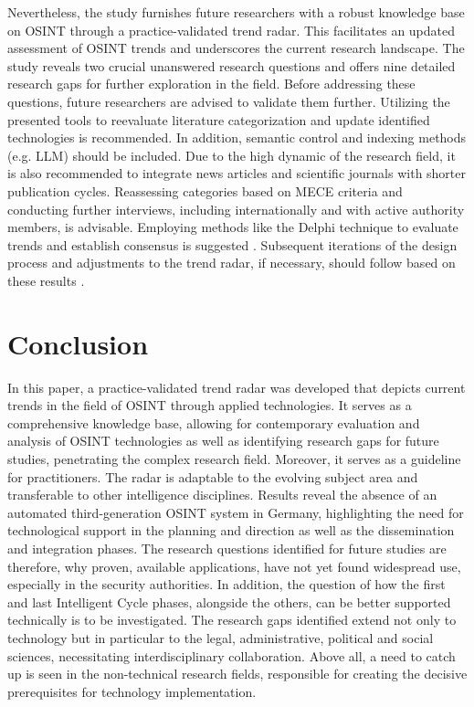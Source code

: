 \documentclass[10pt]{article}
\begin{document}
Nevertheless, the study furnishes future researchers with a robust knowledge base on OSINT
through a practice-validated trend radar. This facilitates an updated assessment of OSINT
trends and underscores the current research landscape. The study reveals two crucial
unanswered research questions and offers nine detailed research gaps for further exploration
in the field. Before addressing these questions, future researchers are advised
to validate them further. Utilizing the presented tools to reevaluate literature
categorization and update identified technologies is recommended. In addition, semantic
control and indexing methods (e.g. LLM) should be included. Due to the high dynamic of the research field,
it is also recommended to integrate news articles and scientific journals with shorter publication cycles.
Reassessing categories based on MECE criteria and conducting further interviews, including internationally
and with active authority members, is advisable. Employing methods like the Delphi technique to evaluate
trends and establish consensus is suggested \cite{Hader.2000}. Subsequent iterations of the design process and adjustments
to the trend radar, if necessary, should follow based on these results \cite{Peffers.2007,Sonnenberg.2012}.

\section{Conclusion}

In this paper, a practice-validated trend radar was developed that depicts current trends
in the field of OSINT through applied technologies. It serves as a comprehensive knowledge base,
allowing for contemporary evaluation and analysis of OSINT technologies as well as identifying research
gaps for future studies, penetrating the complex research field. Moreover, it serves as a guideline for practitioners. The radar
is adaptable to the evolving subject area and transferable to other intelligence disciplines.
Results reveal the absence of an automated third-generation OSINT system in Germany, highlighting the
need for technological support in the planning and direction as well as the dissemination and integration phases.
The research questions identified for future studies are therefore, why proven, available applications,
have not yet found widespread use, especially in the security authorities.
In addition, the question of how the first and last Intelligent Cycle phases, alongside the others,
can be better supported technically is to be investigated. The research gaps identified extend
not only to technology but in particular to the legal, administrative, political and
social sciences, necessitating interdisciplinary collaboration. Above all, a need to catch up is seen
in the non-technical research fields, responsible for creating the decisive prerequisites for technology
implementation.
\end{document}

